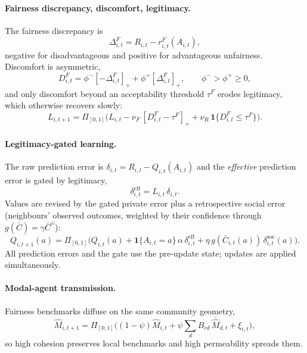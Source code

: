 \documentclass[11pt]{article}
\newcommand{\1}{\mathbf{1}}
\begin{document}
\paragraph{Fairness discrepancy, discomfort, legitimacy.}
The fairness discrepancy is
\begin{equation}
\Delta^F_{i,t}=R_{i,t}-r^F_{i,t}(A_{i,t}),
\label{eq:dF}
\end{equation}
negative for disadvantageous and positive for advantageous unfairness. Discomfort
is asymmetric,
\begin{equation}
D^F_{i,t}=\phi^-[-\Delta^F_{i,t}]_+ + \phi^+[\Delta^F_{i,t}]_+,
\qquad \phi^->\phi^+\ge 0,
\label{eq:DF}
\end{equation}
and only discomfort beyond an acceptability threshold $\tau^F$ erodes legitimacy,
which otherwise recovers slowly:
\begin{equation}
L_{i,t+1}=\Pi_{[0,1]}\Big(L_{i,t}-\nu_F\,[D^F_{i,t}-\tau^F]_+ + \nu_R\,\1\{D^F_{i,t}\le\tau^F\}\Big).
\label{eq:Lupdate}
\end{equation}

\paragraph{Legitimacy-gated learning.}
The raw prediction error is $\delta_{i,t}=R_{i,t}-Q_{i,t}(A_{i,t})$ and the
\emph{effective} prediction error is gated by legitimacy,
\begin{equation}
\delta^{\mathrm{eff}}_{i,t}=L_{i,t}\,\delta_{i,t}.
\label{eq:gate}
\end{equation}
Values are revised by the gated private error plus a retrospective social error
(neighbours' observed outcomes, weighted by their confidence through
$g(\bar C)=\gamma\bar C^{\omega}$):
\begin{equation}
Q_{i,t+1}(a)=\Pi_{[0,1]}\Big(Q_{i,t}(a)+\1\{A_{i,t}=a\}\,\alpha\,\delta^{\mathrm{eff}}_{i,t}
+\eta\,g(\bar C_{i,t}(a))\,\delta^{\mathrm{soc}}_{i,t}(a)\Big).
\label{eq:Qupdate}
\end{equation}
All prediction errors and the gate use the pre-update state; updates are applied
simultaneously.

\paragraph{Modal-agent transmission.}
Fairness benchmarks diffuse on the same community geometry,
\begin{equation}
\hat M_{i,t+1}=\Pi_{[0,1]}\Big((1-\psi)\hat M_{i,t}+\psi\sum_d B_{cd}\,\bar{\hat M}_{d,t}+\xi_{i,t}\Big),
\label{eq:Mupdate}
\end{equation}
so high cohesion preserves local benchmarks and high permeability spreads them.
\end{document}
